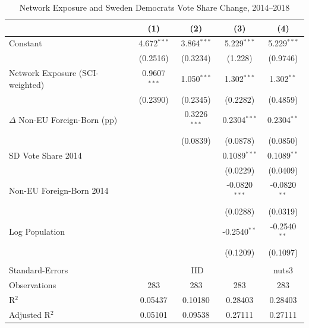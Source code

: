 
\begin{table}[htbp]
   \caption{\label{tab:network_exposure} Network Exposure and Sweden Democrats Vote Share Change, 2014--2018}
   \bigskip
   \centering
   \begin{tabular}{lcccc}
      \toprule
                                         & (1)            & (2)            & (3)             & (4)\\  
      \midrule 
      Constant                           & 4.672$^{***}$  & 3.864$^{***}$  & 5.229$^{***}$   & 5.229$^{***}$\\   
                                         & (0.2516)       & (0.3234)       & (1.228)         & (0.9746)\\   
      Network Exposure (SCI-weighted)    & 0.9607$^{***}$ & 1.050$^{***}$  & 1.302$^{***}$   & 1.302$^{**}$\\   
                                         & (0.2390)       & (0.2345)       & (0.2282)        & (0.4859)\\   
      $\Delta$ Non-EU Foreign-Born (pp)  &                & 0.3226$^{***}$ & 0.2304$^{***}$  & 0.2304$^{**}$\\   
                                         &                & (0.0839)       & (0.0878)        & (0.0850)\\   
      SD Vote Share 2014                 &                &                & 0.1089$^{***}$  & 0.1089$^{**}$\\   
                                         &                &                & (0.0229)        & (0.0409)\\   
      Non-EU Foreign-Born 2014           &                &                & -0.0820$^{***}$ & -0.0820$^{**}$\\   
                                         &                &                & (0.0288)        & (0.0319)\\   
      Log Population                     &                &                & -0.2540$^{**}$  & -0.2540$^{**}$\\   
                                         &                &                & (0.1209)        & (0.1097)\\   
       \\
      Standard-Errors & \multicolumn{3}{c}{IID} & nuts3 \\ 
      Observations                       & 283            & 283            & 283             & 283\\  
      R$^2$                              & 0.05437        & 0.10180        & 0.28403         & 0.28403\\  
      Adjusted R$^2$                     & 0.05101        & 0.09538        & 0.27111         & 0.27111\\  
      \bottomrule
   \end{tabular}
   

\end{table}
